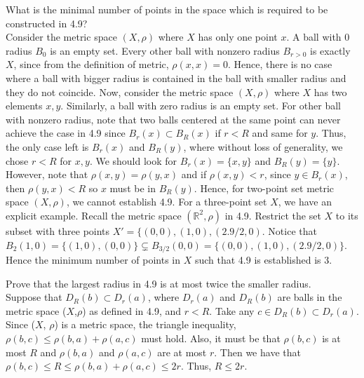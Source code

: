 \documentclass[document]{article}
\begin{document}
\begin{problem}[4.10] What is the minimal number of points in the space which is required to be constructed in 4.9?\\


Consider the metric space $(X,\rho)$ where $X$ has only one point $x$. A ball with 0 radius $B_0$ is an empty set. Every other ball with nonzero radius $B_{r>0}$ is exactly $X$, since from the definition of metric, $\rho(x,x)=0$. Hence, there is no case where a ball with bigger radius is contained in the ball with smaller radius and they do not coincide. Now, consider the metric space $(X,\rho)$ where $X$ has two elements $x,y$. Similarly, a ball with zero radius is an empty set. For other ball with nonzero radius, note that two balls centered at the same point can never achieve the case in 4.9 since $B_r{(x)} \subset B_R(x)$ if $r<R$ and same for $y$. Thus, the only case left is $B_r{(x)}$ and $B_R({y})$, where without loss of generality, we chose $r<R$ for $x, y$. We should look for $B_r(x)=\{x,y\}$ and $B_R(y)=\{y\}$. However, note that $\rho(x,y)=\rho(y,x)$ and if $\rho(x,y) < r$, since $y \in B_r(x)$, then $\rho(y,x) < R$ so $x$ must be in $B_R(y)$. Hence, for two-point set metric space $(X, \rho)$, we cannot establish 4.9. For a three-point set $X$, we have an explicit example. Recall the metric space $(\mathbb{R}^2, \rho)$ in 4.9. Restrict the set $X$ to its subset with three points $X'=\{(0,0), (1,0), (2.9/2,0)$. Notice that $B_2(1,0)=\{(1,0),(0,0)\} \subsetneq B_{3/2}(0,0)=\{(0,0), (1,0), (2.9/2,0)\}$. Hence the minimum number of points in $X$ such that 4.9 is established is 3.

\end{problem}

\begin{problem}[4.11] Prove that the largest radius in 4.9 is at most twice the smaller radius.\\


Suppose that $D_R(b) \subset D_r(a)$, where $D_r(a)$ and $D_R(b)$ are balls in the metric space ($X$,$\rho$) as defined in 4.9, and $r<R$. Take any $c \in D_R(b) \subset D_r(a)$. Since ($X$, $\rho$) is a metric space, the triangle inequality, $\rho(b,c) \leq \rho(b,a) + \rho(a,c)$ must hold. Also, it must be that $\rho(b,c)$ is at most $R$ and $\rho(b,a)$ and $\rho(a,c)$ are at most $r$. Then we have that $\rho(b,c) \leq R \leq \rho(b,a)+\rho(a,c) \leq 2r$. Thus, $R \leq 2r$.
\end{problem} %
\end{document}
